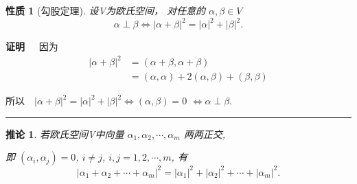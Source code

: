 \documentclass[13pt]{beamer}
\newtheorem*{coro}{推论}
\newtheorem*{prop}{性质}
\def\qed{\nopagebreak\hfill{\rule{4pt}{7pt}}\medbreak}
\def\pf{{\bf 证明~~ }}
\begin{document}
\begin{frame}
\begin{prop}[勾股定理]
设V为欧氏空间， 对任意的 $ \alpha, \beta \in V$
$$\alpha \perp \beta \Longleftrightarrow|\alpha+\beta|^{2}=|\alpha|^{2}+|\beta|^{2}. $$
\end{prop} 

\pf
因为$$
\begin{aligned}
|\alpha+\beta|^{2}& =(\alpha+\beta, \alpha+\beta) \\ 
	& =(\alpha, \alpha)+2(\alpha, \beta)+(\beta, \beta) 
\end{aligned}$$

所以$\quad|\alpha+\beta|^{2}=|\alpha|^{2}+|\beta|^{2} \Longleftrightarrow(\alpha, \beta)=0$
$\Longleftrightarrow \alpha \perp \beta$. \qed

\begin{coro}
若欧氏空间V中向量 $\alpha_{1}, \alpha_{2}, \cdots, \alpha_{m}$ 两两正交,

即 $\left(\alpha_{i}, \alpha_{j}\right)={0}$, \quad $i \neq j$, \quad $i, j=1,2, \cdots, m$, 有
$$\left|\alpha_{1}+\alpha_{2}+\cdots+\alpha_{m}\right|^{2}=\left|\alpha_{1}\right|^{2}+\left|\alpha_{2}\right|^{2}+\cdots+\left|\alpha_{m}\right|^{2}.$$
\end{coro}

\end{frame}
\end{document}
